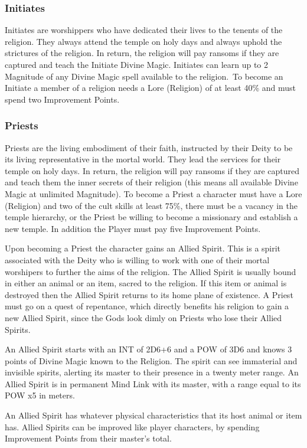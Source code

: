 \subsubsection{Initiates}
Initiates are worshippers who have dedicated their lives to the tenents of the religion. They always attend the temple on holy days and always uphold the strictures of the religion. In return, the religion will pay ransoms if they are captured and teach the Initiate Divine Magic. Initiates can learn up to 2 Magnitude of any Divine Magic spell available to the religion. To become an Initiate a member of a religion needs a Lore (Religion) of at least 40\% and must spend two Improvement Points.

\subsubsection{Priests}
Priests are the living embodiment of their faith, instructed by their Deity to be its living representative in the mortal world. They lead the services for their temple on holy days. In return, the religion will pay ransoms if they are captured and teach them the inner secrets of their religion (this means all available Divine Magic at unlimited Magnitude). To become a Priest a character must have a Lore (Religion) and two of the cult skills at least 75\%, there must be a vacancy in the temple hierarchy, or the Priest be willing to become a missionary and establish a new temple. In addition the Player must pay five Improvement Points.

Upon becoming a Priest the character gains an Allied Spirit. This is a spirit associated with the Deity who is willing to work with one of their mortal worshipers to further the aims of the religion. The Allied Spirit is usually bound in either an animal or an item, sacred to the religion. If this item or animal is destroyed then the Allied Spirit returns to its home plane of existence. A Priest must go on a quest of repentance, which directly benefits his religion to gain a new Allied Spirit, since the Gods look dimly on Priests who lose their Allied Spirits.

An Allied Spirit starts with an INT of 2D6+6 and a POW of 3D6 and knows 3 points of Divine Magic known to the Religion. The spirit can see immaterial and invisible spirits, alerting its master to their presence in a twenty meter range. An Allied Spirit is in permanent Mind Link with its master, with a range equal to its POW x5 in meters. 

An Allied Spirit has whatever physical characteristics that its host animal or item has. Allied Spirits can be improved like player characters, by spending Improvement Points from their master’s total.


